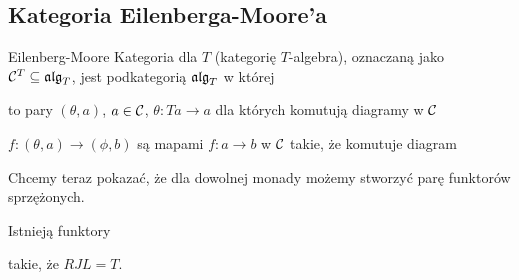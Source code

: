 \subsection{Kategoria Eilenberga-Moore'a}

\begin{definition}{Eilenberg-Moore}{}
  Kategoria  dla $T$ (kategorię $T$-algebra), oznaczaną jako $\mathcal{C}^T\subseteq\operatorname{\mathfrak{alg}}_T$, jest podkategorią $\operatorname{\mathfrak{alg}}_T$ w której
  \begin{description}[labelindent=5mm]
    \item[obiekty] to pary $(\theta, a)$, $a\in\mathcal{C}$, $\theta:Ta\to a$ dla których komutują diagramy w $\mathcal{C}$
      \begin{center}
      \end{center}
    \item[morfizmy] $f:(\theta, a)\to (\phi, b)$ są mapami $f:a\to b$ w $\mathcal{C}$ takie, że komutuje diagram
      \begin{center}
      \end{center}
  \end{description}
\end{definition}

Chcemy teraz pokazać, że dla dowolnej monady możemy stworzyć parę funktorów sprzężonych. 

\begin{lemma}{}{}
  Istnieją funktory
  \begin{center}
  \end{center}
  takie, że $RJL=T$.
\end{lemma}

